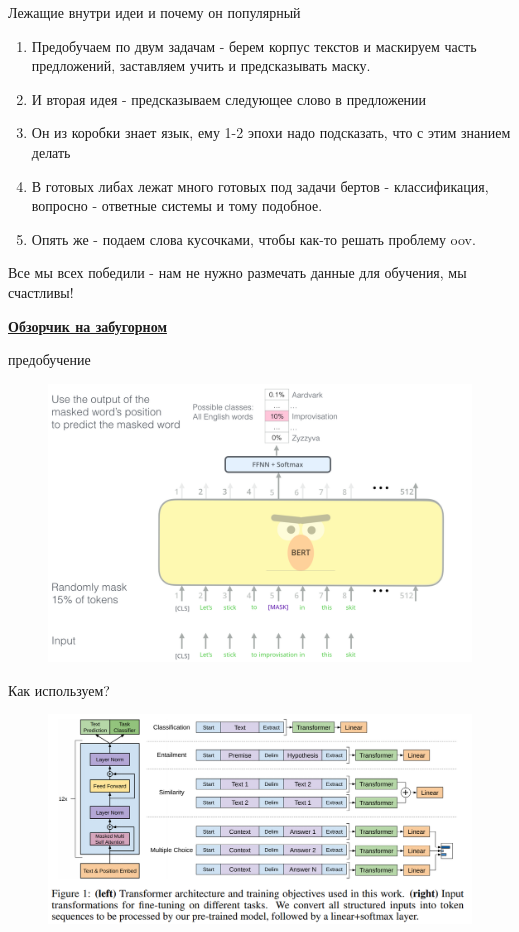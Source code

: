 \documentclass[notes,12pt, aspectratio=169]{beamer}
\begin{document}
\begin{frame}{Лежащие внутри идеи и почему он популярный}
\begin{enumerate}
	\item Предобучаем по двум задачам - берем корпус текстов и маскируем часть предложений, заставляем учить и предсказывать маску.
	\item И вторая идея - предсказываем следующее слово в предложении
	\item Он из коробки знает язык, ему 1-2 эпохи надо подсказать, что с этим знанием делать
	\item В готовых либах лежат много готовых под задачи бертов - классификация, вопросно - ответные системы и тому подобное.
	\item Опять же - подаем слова кусочками, чтобы как-то решать проблему oov.
\end{enumerate}
Все мы всех победили - нам не нужно размечать данные для обучения, мы счастливы!

\href{http://jalammar.github.io/illustrated-bert/}{\textbf{Обзорчик на забугорном}}
\end{frame}



\begin{frame}{предобучение}
\begin{figure}
	\centering
	\includegraphics[width=0.75\linewidth]{images/pre_train_bert}
\end{figure}
\end{frame}

\begin{frame}{Как используем?}
\begin{figure}
	\centering
	\includegraphics[width=0.9\linewidth]{images/use_models}
	\label{fig:seq2seq}
\end{figure}
\end{frame}
\end{document}

